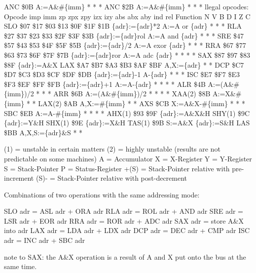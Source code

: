 \begin{code}
ANC	 	\$0B	 	 	 	 	 	 	 	 	 	 	A:=A\&#\{imm\}	*	 	 	 	 	*	*
ANC	 	\$2B	 	 	 	 	 	 	 	 	 	 	A:=A\&#\{imm\}	*	 	 	 	 	*	*
llegal opcodes:
Opcode	imp	imm	zp	zpx	zpy	izx	izy	abs	abx	aby	ind	rel	Function	N	V	B	D	I	Z	C
SLO	 	 	\$07	\$17	 	\$03	\$13	\$0F	\$1F	\$1B	 	 	\{adr\}:=\{adr\}*2 A:=A or \{adr\}	*	 	 	 	 	*	*
RLA	 	 	\$27	\$37	 	\$23	\$33	\$2F	\$3F	\$3B	 	 	\{adr\}:=\{adr\}rol A:=A and \{adr\}	*	 	 	 	 	*	*
SRE	 	 	\$47	\$57	 	\$43	\$53	\$4F	\$5F	\$5B	 	 	\{adr\}:=\{adr\}/2 A:=A exor \{adr\}	*	 	 	 	 	*	*
RRA	 	 	\$67	\$77	 	\$63	\$73	\$6F	\$7F	\$7B	 	 	\{adr\}:=\{adr\}ror A:=A adc \{adr\}	*	*	 	 	 	*	*
SAX	 	 	\$87	 	\$97	\$83	 	\$8F	 	 	 	 	\{adr\}:=A\&X	 	 	 	 	 	 	 
LAX	 	 	\$A7	 	\$B7	\$A3	\$B3	\$AF	 	\$BF	 	 	A,X:=\{adr\}	*	 	 	 	 	*	 
DCP	 	 	\$C7	\$D7	 	\$C3	\$D3	\$CF	\$DF	\$DB	 	 	\{adr\}:=\{adr\}-1 A-\{adr\}	*	 	 	 	 	*	*
ISC	 	 	\$E7	\$F7	 	\$E3	\$F3	\$EF	\$FF	\$FB	 	 	\{adr\}:=\{adr\}+1 A:=A-\{adr\}	*	*	 	 	 	*	*
ALR	 	\$4B	 	 	 	 	 	 	 	 	 	 	A:=(A\&#\{imm\})/2	*	 	 	 	 	*	*
ARR	 	\$6B	 	 	 	 	 	 	 	 	 	 	A:=(A\&#\{imm\})/2	*	*	 	 	 	*	*
XAA(2)	 	\$8B	 	 	 	 	 	 	 	 	 	 	A:=X\&#\{imm\}	*	 	 	 	 	*	 
LAX(2)	 	\$AB	 	 	 	 	 	 	 	 	 	 	A,X:=#\{imm\}	*	 	 	 	 	*	 
AXS	 	\$CB	 	 	 	 	 	 	 	 	 	 	X:=A\&X-#\{imm\}	*	 	 	 	 	*	*
SBC	 	\$EB	 	 	 	 	 	 	 	 	 	 	A:=A-\#\{imm\}	*	*	 	 	 	*	*
AHX(1) 	 	 	 	 	 	\$93	 	 	\$9F	 	 	\{adr\}:=A\&X\&H	 	 	 	 	 	 	 
SHY(1)	 	 	 	 	 	 	 	 	\$9C	 	 	 	\{adr\}:=Y\&H	 	 	 	 	 	 	 
SHX(1)	 	 	 	 	 	 	 	 	 	\$9E	 	 	\{adr\}:=X\&H	 	 	 	 	 	 	 
TAS(1)	 	 	 	 	 	 	 	 	 	\$9B	 	 	S:=A\&X \{adr\}:=S\&H	 	 	 	 	 	 	 
LAS	 	 	 	 	 	 	 	 	 	\$BB	 	 	A,X,S:=\{adr\}\&S	*	 	 	 	 	*	 


(1) = unstable in certain matters
(2) = highly unstable (results are not predictable on some machines)
A = Accumulator
X = X-Register
Y = Y-Register
S = Stack-Pointer
P = Status-Register
+(S) = Stack-Pointer relative with pre-increment
(S)- = Stack-Pointer relative with post-decrement


Combinations of two operations with the same addressing mode:

SLO {adr} = ASL {adr} + ORA {adr}
RLA {adr} = ROL {adr} + AND {adr}
SRE {adr} = LSR {adr} + EOR {adr}
RRA {adr} = ROR {adr} + ADC {adr}
SAX {adr} = store A\&X into {adr}
LAX {adr} = LDA {adr} + LDX {adr}
DCP {adr} = DEC {adr} + CMP {adr}
ISC {adr} = INC {adr} + SBC {adr}

note to SAX: the A&X operation is a result of A and X put onto the bus at the same time.



\end{code}
